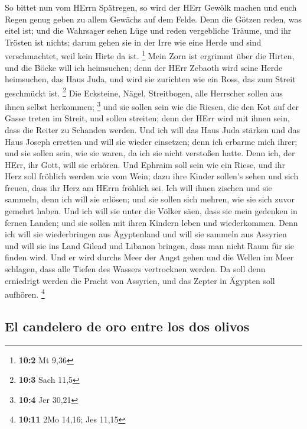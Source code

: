  So bittet nun vom HErrn Spätregen, so wird der HErr
Gewölk machen und euch Regen genug geben zu allem Gewächs auf dem Felde.
 Denn die Götzen reden, was eitel ist; und die Wahrsager
sehen Lüge und reden vergebliche Träume, und ihr Trösten ist nichts;
darum gehen sie in der Irre wie eine Herde und sind verschmachtet, weil
kein Hirte da ist. \footnote{\textbf{10:2} Mt 9,36}  Mein
Zorn ist ergrimmt über die Hirten, und die Böcke will ich heimsuchen;
denn der HErr Zebaoth wird seine Herde heimsuchen, das Haus Juda, und
wird sie zurichten wie ein Ross, das zum Streit geschmückt ist.
\footnote{\textbf{10:3} Sach 11,5}  Die Ecksteine, Nägel,
Streitbogen, alle Herrscher sollen aus ihnen selbst herkommen;
\footnote{\textbf{10:4} Jer 30,21}  und sie sollen sein
wie die Riesen, die den Kot auf der Gasse treten im Streit, und sollen
streiten; denn der HErr wird mit ihnen sein, dass die Reiter zu Schanden
werden.  Und ich will das Haus Juda stärken und das Haus
Joseph erretten und will sie wieder einsetzen; denn ich erbarme mich
ihrer; und sie sollen sein, wie sie waren, da ich sie nicht verstoßen
hatte. Denn ich, der HErr, ihr Gott, will sie erhören. 
Und Ephraim soll sein wie ein Riese, und ihr Herz soll fröhlich werden
wie vom Wein; dazu ihre Kinder sollen's sehen und sich freuen, dass ihr
Herz am HErrn fröhlich sei.  Ich will ihnen zischen und
sie sammeln, denn ich will sie erlösen; und sie sollen sich mehren, wie
sie sich zuvor gemehrt haben.  Und ich will sie unter die
Völker säen, dass sie mein gedenken in fernen Landen; und sie sollen mit
ihren Kindern leben und wiederkommen.  Denn ich will sie
wiederbringen aus Ägyptenland und will sie sammeln aus Assyrien und will
sie ins Land Gilead und Libanon bringen, dass man nicht Raum für sie
finden wird.  Und er wird durchs Meer der Angst gehen und
die Wellen im Meer schlagen, dass alle Tiefen des Wassers vertrocknen
werden. Da soll denn erniedrigt werden die Pracht von Assyrien, und das
Zepter in Ägypten soll aufhören. \footnote{\textbf{10:11} 2Mo 14,16; Jes
  11,15}

\hypertarget{el-candelero-de-oro-entre-los-dos-olivos}{%
\subsection{El candelero de oro entre los dos
olivos}\label{el-candelero-de-oro-entre-los-dos-olivos}}


